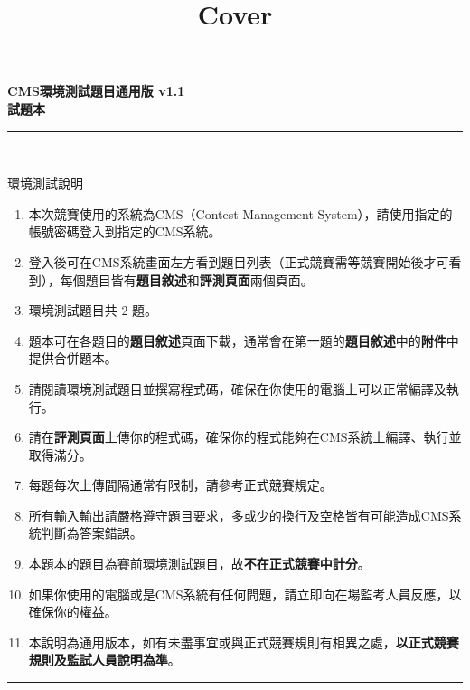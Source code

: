\documentclass[a4paper]{article}
\title{Cover}
\begin{document}
\begin{center}
\textbf{\huge CMS環境測試題目通用版 v1.1}\\
\vspace{5mm}
\textbf{\huge 試題本}\\
\vspace{10mm}
\rule{17cm}{2pt}\\
\vspace{5mm}

\huge 環境測試說明\\
\end{center}

\fontsize{14pt}{20pt}\selectfont
\begin{enumerate}
    \setlength\itemsep{0.5pt}
    \item 本次競賽使用的系統為CMS（Contest Management System），請使用指定的帳號密碼登入到指定的CMS系統。
    \item 登入後可在CMS系統畫面左方看到題目列表（正式競賽需等競賽開始後才可看到），每個題目皆有\textbf{題目敘述}和\textbf{評測頁面}兩個頁面。
    \item 環境測試題目共 2 題。
    \item 題本可在各題目的\textbf{題目敘述}頁面下載，通常會在第一題的\textbf{題目敘述}中的\textbf{附件}中提供合併題本。
    \item 請閱讀環境測試題目並撰寫程式碼，確保在你使用的電腦上可以正常編譯及執行。
    \item 請在\textbf{評測頁面}上傳你的程式碼，確保你的程式能夠在CMS系統上編譯、執行並取得滿分。
    \item 每題每次上傳間隔通常有限制，請參考正式競賽規定。
    \item 所有輸入輸出請嚴格遵守題目要求，多或少的換行及空格皆有可能造成CMS系統判斷為答案錯誤。
    \item 本題本的題目為賽前環境測試題目，故\textbf{不在正式競賽中計分}。
    \item 如果你使用的電腦或是CMS系統有任何問題，請立即向在場監考人員反應，以確保你的權益。
    \item 本說明為通用版本，如有未盡事宜或與正式競賽規則有相異之處，\textbf{以正式競賽規則及監試人員說明為準}。

\end{enumerate}

\begin{center}
\rule{17cm}{2pt}\\
\end{center}
\end{document}
